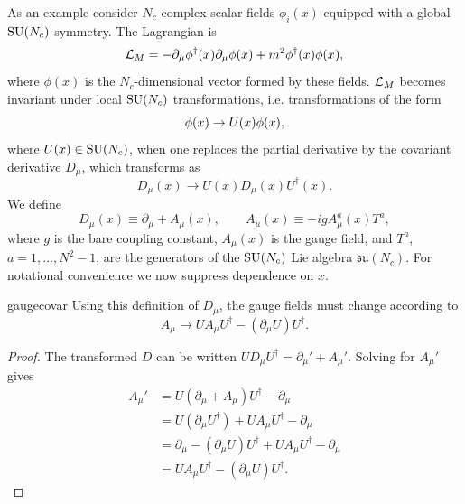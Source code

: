 As an example consider $N_c$ complex scalar fields $\phi_{i}(x)$ equipped with 
a global $\operatorname{SU}(N_c)$ symmetry. The Lagrangian is
\begin{equation}\label{eq:LagrM}
  \mathcal{L}_{M}=-\partial_{\mu}\phi^{\dagger}(x)\partial_{\mu}\phi(x)
                +m^{2}\phi^{\dagger}(x)\phi(x),
\end{equation}
where $\phi(x)$ is the $N_c$-dimensional vector formed by these fields.
$\mathcal{L}_{M}$ becomes invariant under local $\operatorname{SU}(N_c)$ transformations, i.e. 
transformations of the form
\begin{equation}\label{eq:fxform}\index{gauge!transformation}
  \phi(x)\to U(x)\phi(x),
\end{equation}
where $U(x)\in \operatorname{SU}(N_c)$, when one replaces the partial derivative by the 
covariant derivative $D_\mu$, which transforms as
\begin{equation}\label{eq:dxform}
  D_\mu(x)\to U(x) D_{\mu}(x)U^{\dagger}(x).
\end{equation}
We define
\begin{equation}\label{eq:covariantderivative}
  D_{\mu}(x)\equiv\partial_{\mu}+A_{\mu}(x), \qquad 
       A_{\mu}(x)\equiv-igA^{a}_{\mu}(x)T^{a},
\end{equation}
where $g$ is the bare coupling constant, $A_{\mu}(x)$ is the gauge field, and 
$T^{a}$, $a=1,\dots,N^2-1$, are the generators of the $\operatorname{SU}(N_c)$ Lie algebra 
$\mathfrak{su}(N_c)$. For notational convenience we now suppress dependence
on $x$. 

\begin{proposition}{}{gaugecovar}
Using this definition of $D_\mu$, the gauge fields must change 
according to
$$A_{\mu}\to U A_{\mu}U^{\dagger}-(\partial_{\mu}U)U^{\dagger}.$$
  \begin{proof} The transformed $D$ can be written
  $U D_\mu U^\dagger=\partial_\mu'+A_\mu'$. Solving for $A_\mu'$ gives
    \begin{equation*}
    \begin{aligned}
         A_\mu'
         &=U(\partial_\mu+A_\mu)U^\dagger-\partial_\mu\\
         &=U(\partial_\mu U^\dagger)
               +U A_\mu U^\dagger-\partial_\mu\\
         &=\partial_\mu-(\partial_\mu U)U^\dagger
               +U A_\mu U^\dagger-\partial_\mu\\
         &=U A_\mu U^\dagger
                -(\partial_\mu U)U^\dagger.      
    \end{aligned}
    \end{equation*}
  \end{proof}
\end{proposition}

